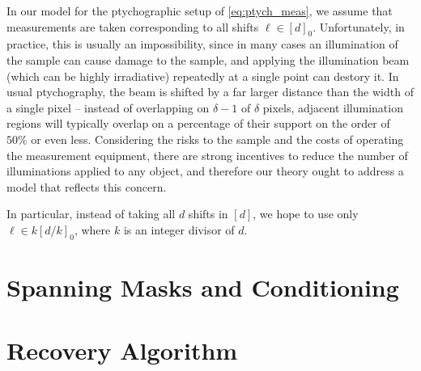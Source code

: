 In our model for the ptychographic setup of \eqref{eq:ptych_meas}, we assume that measurements are taken corresponding to all shifts $\ell \in [d]_0$.  Unfortunately, in practice, this is usually an impossibility, since in many cases an illumination of the sample can cause damage to the sample, and applying the illumination beam (which can be highly irradiative) repeatedly at a single point can destory it.  In usual ptychography, the beam is shifted by a far larger distance than the width of a single pixel -- instead of overlapping on $\delta - 1$ of $\delta$ pixels, adjacent illumination regions will typically overlap on a percentage of their support on the order of $50\%$ or even less.  Considering the risks to the sample and the costs of operating the measurement equipment, there are strong incentives to reduce the number of illuminations applied to any object, and therefore our theory ought to address a model that reflects this concern.

In particular, instead of taking all $d$ shifts in $[d]$, we hope to use only $\ell \in k [d / k]_0$, where $k$ is an integer divisor of $d$.

\section{Spanning Masks and Conditioning}

\label{sec:con_number_ptych}

\section{Recovery Algorithm}

\label{sec:ptych_recovery}
